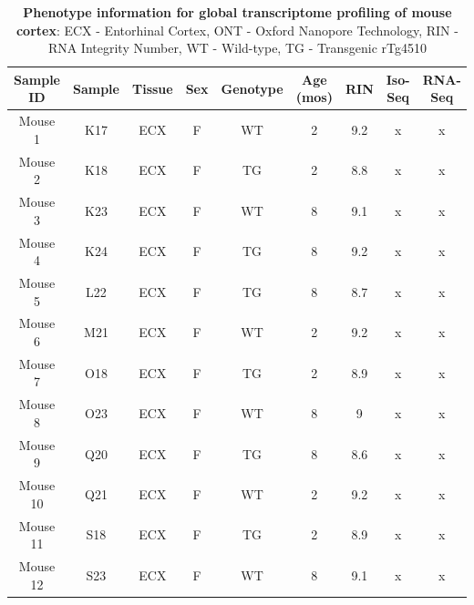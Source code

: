 \vspace{1cm}
\begin{table}[h]
	\captionsetup{width=0.95\textwidth}
	\caption[Phenotype information for global transcriptome profiling of mouse cortex]%
	{\textbf{Phenotype information for global transcriptome profiling of mouse cortex}: ECX - Entorhinal Cortex, ONT - Oxford Nanopore Technology, RIN - RNA Integrity Number, WT - Wild-type, TG - Transgenic rTg4510}
	\label{tab:whole_phenotype}
	\centering
	\begin{tabular}{@{}ccccccccc@{}}
		\toprule
		Sample ID & Sample & Tissue & Sex & Genotype & Age (mos) & RIN & Iso-Seq & RNA-Seq  \\ \midrule
		Mouse 1   & K17    & ECX    & F   & WT       & 2         & 9.2 & x       & x        \\
		Mouse 2   & K18    & ECX    & F   & TG       & 2         & 8.8 & x       & x       \\
		Mouse 3   & K23    & ECX    & F   & WT       & 8         & 9.1 & x       & x       \\
		Mouse 4   & K24    & ECX    & F   & TG       & 8         & 9.2 & x       & x       \\
		Mouse 5   & L22    & ECX    & F   & TG       & 8         & 8.7 & x       & x       \\
		Mouse 6   & M21    & ECX    & F   & WT       & 2         & 9.2 & x       & x       \\
		Mouse 7   & O18    & ECX    & F   & TG       & 2         & 8.9 & x       & x       \\
		Mouse 8   & O23    & ECX    & F   & WT       & 8         & 9   & x       & x      \\
		Mouse 9   & Q20    & ECX    & F   & TG       & 8         & 8.6 & x       & x       \\
		Mouse 10  & Q21    & ECX    & F   & WT       & 2         & 9.2 & x       & x       \\
		Mouse 11  & S18    & ECX    & F   & TG       & 2         & 8.9 & x       & x      \\
		Mouse 12  & S23    & ECX    & F   & WT       & 8         & 9.1 & x       & x       \\ \bottomrule
	\end{tabular}
\end{table}

